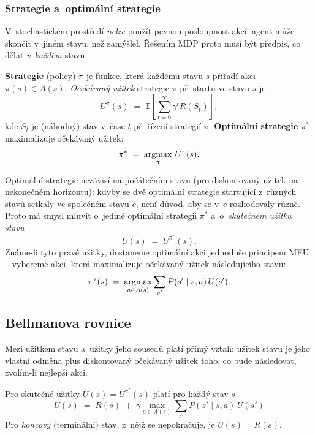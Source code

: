 \subsubsection*{Strategie a~optimální strategie}

V~stochastickém prostředí \emph{nelze} použít pevnou posloupnost akcí: agent může skončit v~jiném stavu, než zamýšlel. Řešením MDP proto musí být předpis, co dělat \emph{v~každém} stavu.

\begin{definice}
\textbf{Strategie} (policy) $\pi$ je funkce, která každému stavu $s$ přiřadí akci $\pi(s)\in A(s)$. \emph{Očekávaný užitek} strategie $\pi$ při startu ve stavu $s$ je
\[
  U^\pi(s) \;=\; \mathbb{E}\!\left[\sum_{t=0}^{\infty} \gamma^t R(S_t)\right],
\]
kde $S_t$ je (náhodný) stav v~čase $t$ při řízení strategií $\pi$. \textbf{Optimální strategie} $\pi^\ast$ maximalizuje očekávaný užitek:
\[
  \pi^\ast \;=\; \operatorname*{argmax}_{\pi}\, U^\pi(s).
\]
\end{definice}

\begin{intuice}
Optimální strategie nezávisí na počátečním stavu (pro diskontovaný užitek na nekonečném horizontu): kdyby se dvě optimální strategie startující z~různých stavů setkaly ve společném stavu $c$, není důvod, aby se v~$c$ rozhodovaly různě. Proto má smysl mluvit o~jediné optimální strategii $\pi^\ast$ a~o~\emph{skutečném užitku stavu}
\[
  U(s) \;=\; U^{\pi^\ast}(s).
\]
Známe-li tyto pravé užitky, dostaneme optimální akci jednoduše principem MEU -- vybereme akci, která maximalizuje očekávaný užitek následujícího stavu:
\[
  \pi^\ast(s) \;=\; \operatorname*{argmax}_{a\in A(s)} \sum_{s'} P(s'\mid s,a)\,U(s').
\]
\end{intuice}

\subsection{Bellmanova rovnice}

Mezi užitkem stavu a~užitky jeho sousedů platí přímý vztah: užitek stavu je jeho vlastní odměna plus diskontovaný očekávaný užitek toho, co bude následovat, zvolím-li nejlepší akci.

\begin{veta}
Pro skutečné užitky $U(s)=U^{\pi^\ast}(s)$ platí pro každý stav $s$
\[
  \boxed{\,U(s) \;=\; R(s) \;+\; \gamma \max_{a\in A(s)} \sum_{s'} P(s'\mid s,a)\,U(s')\,}
\]
Pro \emph{koncový} (terminální) stav, z~nějž se nepokračuje, je $U(s)=R(s)$.
\end{veta}


